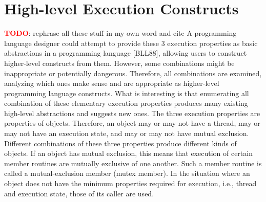 \section{High-level Execution Constructs}
\textbf{\textcolor{red}{TODO}}: rephrase all these stuff in my own word and cite
A programming language designer could attempt to provide these 3 execution
properties as basic abstractions in a
programming language [BLL88], allowing users to construct higher-level
constructs from them. However, some combinations
might be inappropriate or potentially dangerous. Therefore, all combinations are
examined, analyzing which
ones make sense and are appropriate as higher-level programming language
constructs. What is interesting is that
enumerating all combination of these elementary execution properties produces
many existing high-level abstractions
and suggests new ones.
The three execution properties are properties of objects. Therefore, an object
may or may not have a thread, may
or may not have an execution state, and may or may not have mutual exclusion.
Different combinations of these three
properties produce different kinds of objects. If an object has mutual
exclusion, this means that execution of certain
member routines are mutually exclusive of one another. Such a member routine is
called a mutual-exclusion member
(mutex member). In the situation where an object does not have the minimum
properties required for execution, i.e.,
thread and execution state, those of its caller are used.

